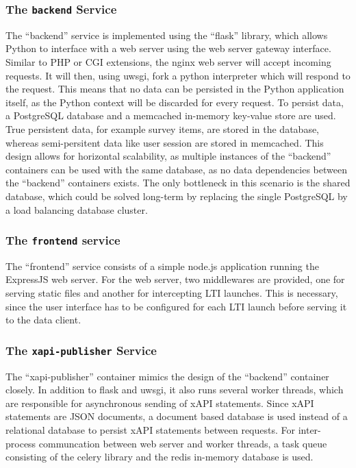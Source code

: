 \documentclass[a4paper,11pt]{article}
\def\inline{\lstinline[basicstyle=\ttfamily,keywordstyle={}]}
\begin{document}
            \subsubsection{The \inline{backend} Service}
                The ``backend'' service is implemented using the ``flask''
                library, which allows Python to interface with a web server
                using the web server gateway interface. Similar
                to PHP or CGI extensions, the nginx web server will accept incoming
                requests. It will then, using uwsgi, fork a python interpreter
                which will respond to the request. This means that no data
                can be persisted in the Python application itself, as the
                Python context will be discarded for every request.
                To persist data, a PostgreSQL database and a memcached
                in-memory key-value store are used.
                True persistent data, for example survey items, are stored
                in the database, whereas semi-persitent data like user
                session are stored in memcached. This design allows
                for horizontal scalability, as multiple instances of the
                ``backend'' containers can be used with the same database,
                as no data dependencies between the ``backend'' containers
                exists. The only bottleneck in this scenario is the shared database,
                which could be solved long-term by replacing the single PostgreSQL
                by a load balancing database cluster.

            \subsubsection{The \inline{frontend} service}
                The ``frontend'' service consists of a simple node.js
                application running the ExpressJS web server. For the
                web server, two middlewares are provided, one for
                serving static files and another for intercepting LTI launches.
                This is necessary, since the user interface has to be
                configured for each LTI launch before serving it to the data client.

            \subsubsection{The \inline{xapi-publisher} Service}
                The ``xapi-publisher'' container mimics the design of the
                ``backend'' container closely. In addition to flask and uwsgi,
                it also runs several worker threads, which are responsible for
                asynchronous sending of xAPI statements. Since xAPI statements
                are JSON documents, a document based database is used instead
                of a relational database to persist xAPI statements between requests.
                For inter-process communcation between web server and
                worker threads, a task queue consisting of the celery library
                and the redis in-memory database is used.
\end{document}
